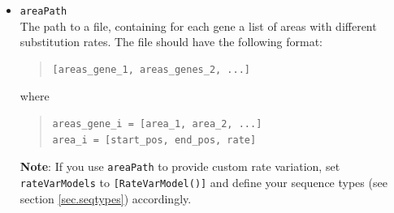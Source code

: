 \documentclass[11pt]{article}
\begin{document}
\begin{itemize}
\item{\texttt{areaPath}} \hfill \\
The path to a file, containing for each gene a list of areas with different substitution rates. The file should have the following format:
\begin{quote}
\begin{verbatim}
[areas_gene_1, areas_genes_2, ...]
\end{verbatim}
\end{quote}
\noindent where
\begin{quote}
\begin{verbatim}
areas_gene_i = [area_1, area_2, ...]
area_i = [start_pos, end_pos, rate]
\end{verbatim}
\end{quote}

\noindent \textbf{Note}: If you use \texttt{areaPath} to provide custom rate variation, set \texttt{rateVarModels} to \texttt{[RateVarModel()]} and define your sequence types (see section \ref{sec.seqtypes}) accordingly.
\end{itemize}
\end{document}
